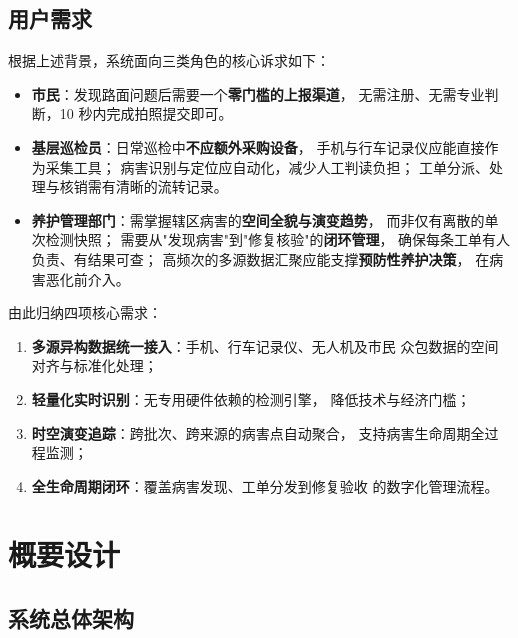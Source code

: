 \documentclass[UTF8, a4paper, fontset=ubuntu]{ctexart}
\begin{document}
  \subsection{用户需求}

  根据上述背景，系统面向三类角色的核心诉求如下：

  \begin{itemize}
      \item \textbf{市民}：发现路面问题后需要一个\textbf{零门槛的上报渠道}，
      无需注册、无需专业判断，10 秒内完成拍照提交即可。

      \item \textbf{基层巡检员}：日常巡检中\textbf{不应额外采购设备}，
      手机与行车记录仪应能直接作为采集工具；
      病害识别与定位应自动化，减少人工判读负担；
      工单分派、处理与核销需有清晰的流转记录。

      \item \textbf{养护管理部门}：需掌握辖区病害的\textbf{空间全貌与演变趋势}，
      而非仅有离散的单次检测快照；
      需要从"发现病害"到"修复核验"的\textbf{闭环管理}，
      确保每条工单有人负责、有结果可查；
      高频次的多源数据汇聚应能支撑\textbf{预防性养护决策}，
      在病害恶化前介入。
  \end{itemize}

由此归纳四项核心需求：
  \begin{enumerate}[label=\textbf{R\arabic*.}, leftmargin=3.5em, itemsep=2pt]
    \item \textbf{多源异构数据统一接入}：手机、行车记录仪、无人机及市民
          众包数据的空间对齐与标准化处理；
    \item \textbf{轻量化实时识别}：无专用硬件依赖的检测引擎，
          降低技术与经济门槛；
    \item \textbf{时空演变追踪}：跨批次、跨来源的病害点自动聚合，
          支持病害生命周期全过程监测；
    \item \textbf{全生命周期闭环}：覆盖病害发现、工单分发到修复验收
          的数字化管理流程。
  \end{enumerate}
  
  \section{概要设计}

  \subsection{系统总体架构}
\end{document}

